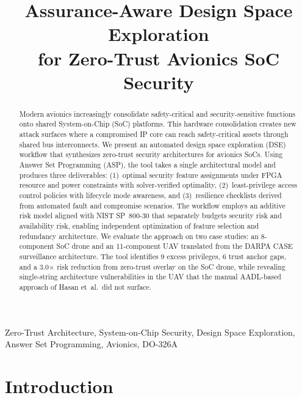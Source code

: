 \documentclass[conference]{IEEEtran}
\begin{document}
\title{Assurance-Aware Design Space Exploration\\
for Zero-Trust Avionics SoC Security}

\author{}

\maketitle

\begin{abstract}
Modern avionics increasingly consolidate safety-critical and
security-sensitive functions onto shared System-on-Chip (SoC) platforms.
This hardware consolidation creates new attack surfaces where a compromised
IP core can reach safety-critical assets through shared bus interconnects.
We present an automated design space exploration (DSE) workflow that
synthesizes zero-trust security architectures for avionics SoCs.
Using Answer Set Programming (ASP), the tool takes a single architectural
model and produces three deliverables: (1)~optimal security feature
assignments under FPGA resource and power constraints with solver-verified
optimality, (2)~least-privilege access control policies with lifecycle mode
awareness, and (3)~resilience checklists derived from automated fault and
compromise scenarios.
The workflow employs an additive risk model aligned with NIST SP~800-30
that separately budgets security risk and availability risk, enabling
independent optimization of feature selection and redundancy architecture.
We evaluate the approach on two case studies: an 8-component SoC drone
and an 11-component UAV translated from the DARPA CASE surveillance
architecture. The tool identifies 9 excess privileges, 6 trust anchor
gaps, and a 3.0$\times$ risk reduction from zero-trust overlay on the SoC
drone, while revealing single-string architecture vulnerabilities in the
UAV that the manual AADL-based approach of Hasan et~al.\ did not surface.
\end{abstract}

\begin{IEEEkeywords}
Zero-Trust Architecture, System-on-Chip Security, Design Space
Exploration, Answer Set Programming, Avionics, DO-326A
\end{IEEEkeywords}

\section{Introduction}
\end{document}
